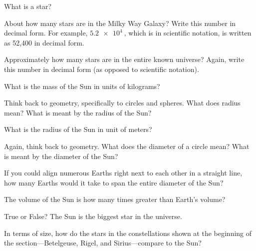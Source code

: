 \documentclass{article}
\numberwithin{equation}{section}
\numberwithin{figure}{section}
\begin{document}
\begin{exercise}
    What is a star?
\end{exercise}

\begin{exercise}
    About how many stars are in the Milky Way Galaxy? Write this number in decimal form. For example, $\SI{5.2e4}{}$, which is in scientific notation, is written as 52,400 in decimal form.
\end{exercise}

\begin{exercise}
    Approximately how many stars are in the entire known universe? Again, write this number in decimal form (as opposed to scientific notation).
\end{exercise}

\begin{exercise}
    What is the mass of the Sun in units of kilograms?
\end{exercise}

\begin{exercise}
    Think back to geometry, specifically to circles and spheres. What does radius mean? What is meant by the radius of the Sun? 
\end{exercise}

\begin{exercise}
    What is the radius of the Sun in unit of meters?
\end{exercise}

\begin{exercise}
    Again, think back to geometry. What does the diameter of a circle mean? What is meant by the diameter of the Sun?
\end{exercise}

\begin{exercise}
    If you could align numerous Earths right next to each other in a straight line, how many Earths would it take to span the entire diameter of the Sun?
\end{exercise}

\begin{exercise}
    The volume of the Sun is how many times greater than Earth's volume?
\end{exercise}

\begin{exercise}
    True or False? The Sun is the biggest star in the universe.
\end{exercise}

\begin{exercise}
    In terms of size, how do the stars in the constellations shown at the beginning of the section---Betelgeuse, Rigel, and Sirius---compare to the Sun?
\end{exercise}
\end{document}
